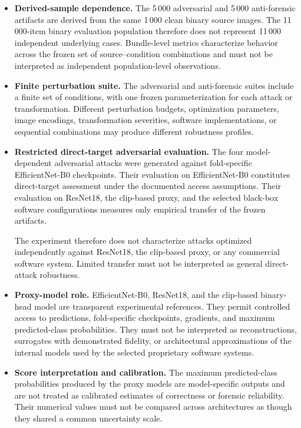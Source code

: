 \begin{itemize}
\item \textbf{Derived-sample dependence.}
The 5\,000 adversarial and 5\,000 anti-forensic artifacts are derived from the
same 1\,000 clean binary source images. The 11\,000-item binary evaluation
population therefore does not represent 11\,000 independent underlying cases.
Bundle-level metrics characterize behavior across the frozen set of
source--condition combinations and must not be interpreted as independent
population-level observations.

\item \textbf{Finite perturbation suite.}
The adversarial and anti-forensic suites include a finite set of conditions,
with one frozen parameterization for each attack or transformation. Different
perturbation budgets, optimization parameters, image encodings, transformation
severities, software implementations, or sequential combinations may produce
different robustness profiles.

\item \textbf{Restricted direct-target adversarial evaluation.}
The four model-dependent adversarial attacks were generated against
fold-specific EfficientNet-B0 checkpoints. Their evaluation on EfficientNet-B0
constitutes direct-target assessment under the documented access assumptions.
Their evaluation on ResNet18, the \gls{clip}-based proxy, and the selected
black-box software configurations measures only empirical transfer of the
frozen artifacts.

The experiment therefore does not characterize attacks optimized independently
against ResNet18, the \gls{clip}-based proxy, or any commercial software system.
Limited transfer must not be interpreted as general direct-attack robustness.

\item \textbf{Proxy-model role.}
EfficientNet-B0, ResNet18, and the \gls{clip}-based binary-head model are
transparent experimental references. They permit controlled access to
predictions, fold-specific checkpoints, gradients, and maximum predicted-class
probabilities. They must not be interpreted as reconstructions, surrogates with
demonstrated fidelity, or architectural approximations of the internal models
used by the selected proprietary software systems.

\item \textbf{Score interpretation and calibration.}
The maximum predicted-class probabilities produced by the proxy models are
model-specific outputs and are not treated as calibrated estimates of
correctness or forensic reliability. Their numerical values must not be
compared across architectures as though they shared a common uncertainty scale.


\end{itemize}
